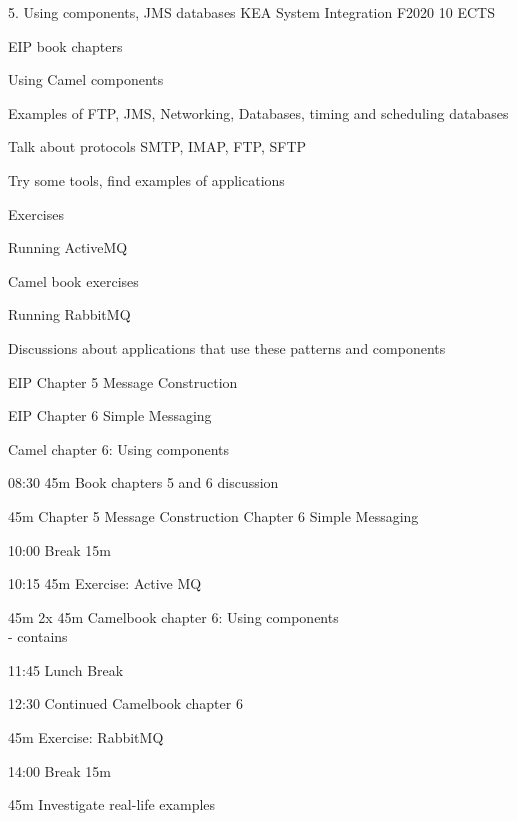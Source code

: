 \documentclass[Screen16to9,17pt]{foils}
\begin{document}
\mytitlepage
{5. Using components, JMS
 databases}
{KEA System Integration F2020 10 ECTS}


\begin{list2}
\item EIP book chapters
\item Using Camel components
\item Examples of FTP, JMS, Networking, Databases, timing and scheduling
 databases
\item Talk about protocols SMTP, IMAP, FTP, SFTP
\item Try some tools, find examples of applications
\end{list2}

Exercises
\begin{list2}
\item Running ActiveMQ
\item Camel book exercises
\item Running RabbitMQ
\item Discussions about applications that use these patterns and components
\end{list2}




\begin{list1}
\item EIP Chapter 5 Message Construction
\item EIP Chapter 6 Simple Messaging
\item Camel chapter 6: Using components

\end{list1}




\begin{list2}
\item 08:30 45m Book chapters 5 and 6 discussion
\item 45m Chapter 5 Message Construction Chapter 6 Simple Messaging
\item 10:00 Break 15m
\item 10:15 45m Exercise: Active MQ
\item 45m 2x 45m Camelbook chapter 6: Using components\\
 - contains
\item 11:45 Lunch Break
\item 12:30 Continued Camelbook chapter 6
\item 45m Exercise: RabbitMQ
\item 14:00 Break 15m
\item 45m Investigate real-life examples
\end{list2}
\end{document}

